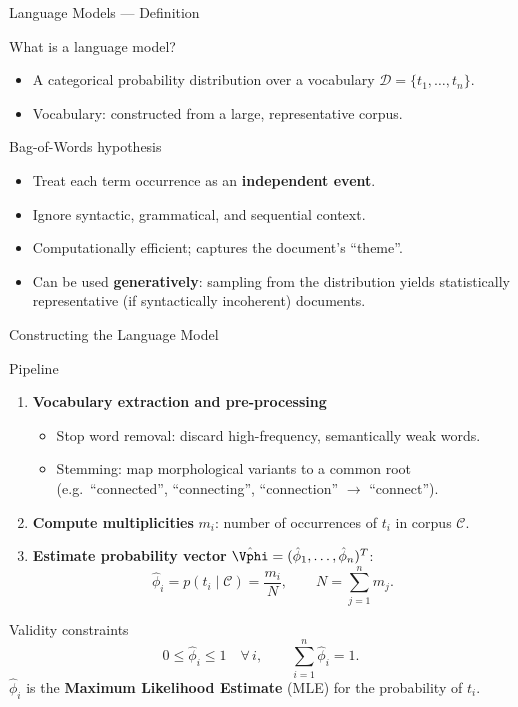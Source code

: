 \begin{frame}{Language Models — Definition}
  \begin{block}{What is a language model?}
    \begin{itemize}
      \item A \alert{categorical probability distribution} over a vocabulary $\mathcal{D}=\{t_1,\ldots,t_n\}$.
      \item Vocabulary: constructed from a large, representative corpus.
    \end{itemize}
  \end{block}

  \begin{block}{Bag-of-Words hypothesis}
    \begin{itemize}
      \item Treat each term occurrence as an \textbf{independent event}.
      \item Ignore syntactic, grammatical, and sequential context.
      \item Computationally efficient; captures the document's ``theme''.
      \item Can be used \textbf{generatively}: sampling from the distribution yields
            statistically representative (if syntactically incoherent) documents.
    \end{itemize}
  \end{block}
\end{frame}

\begin{frame}{Constructing the Language Model}
  \begin{block}{Pipeline}
    \begin{enumerate}
      \item \textbf{Vocabulary extraction and pre-processing}
        \begin{itemize}
          \item \alert{Stop word removal}: discard high-frequency, semantically weak words.
          \item \alert{Stemming}: map morphological variants to a common root
                (e.g.\ ``connected'', ``connecting'', ``connection'' $\to$ ``connect'').
        \end{itemize}
      \item \textbf{Compute multiplicities} $m_i$: number of occurrences of $t_i$ in corpus $\mathcal{C}$.
      \item \textbf{Estimate probability vector} $\hat\Vphi=(\hat\phi_1,\ldots,\hat\phi_n)^T$:
        \[
          \hat\phi_i = p(t_i\mid\mathcal{C})=\frac{m_i}{N},\qquad N=\sum_{j=1}^n m_j.
        \]
    \end{enumerate}
  \end{block}

  \begin{block}{Validity constraints}
    \[
      0\le\hat\phi_i\le1\quad\forall\,i,\qquad\sum_{i=1}^n\hat\phi_i=1.
    \]
    $\hat\phi_i$ is the \textbf{Maximum Likelihood Estimate} (MLE) for the probability of $t_i$.
  \end{block}
\end{frame}

